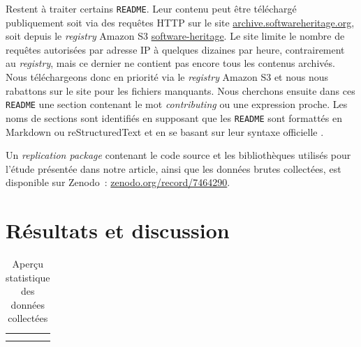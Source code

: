 \documentclass[dvipsnames,runningheads]{llncs}
\newcommand{\en}[1]{\foreignlanguage{english}{\emph{#1}}}
\begin{document}
    \label{sec:collectreadme}
    Restent à traiter certains \texttt{README}. Leur contenu peut être téléchargé publiquement soit via des
    requêtes HTTP sur le site \href{https://archive.softwareheritage.org/}{archive.softwareheritage.org}, soit
    depuis le \en{registry} Amazon S3
    \href{https://registry.opendata.aws/software-heritage}{software-heritage}. Le site limite le nombre de
    requêtes autorisées par adresse IP à quelques dizaines par heure, contrairement au \en{registry}, mais ce
    dernier ne contient pas encore tous les contenus archivés. Nous téléchargeons donc en priorité via le
    \en{registry} Amazon S3 et nous nous rabattons sur le site pour les fichiers manquants. Nous cherchons
    ensuite dans ces \texttt{README} une section contenant le mot \en{contributing} ou une expression proche.
    Les noms de sections sont identifiés en supposant que les \texttt{README} sont formattés en Markdown ou
    reStructuredText et en se basant sur leur syntaxe officielle \parencite{markdown-headings,rst-sections}.

    Un \en{replication package} contenant le code source et les bibliothèques utilisés pour l'étude présentée
    dans notre article, ainsi que les données brutes collectées, est disponible sur Zenodo :
    \href{https://zenodo.org/record/7464290}{zenodo.org/record/7464290}.

    \section{Résultats et discussion}

    \captionsetup[figure]{format=plain,singlelinecheck=true,justification=centering}
    \captionsetup[subfigure]{format=plain,singlelinecheck=true,justification=centering}
    \captionsetup[table]{format=plain,singlelinecheck=true,justification=centering,position=above}

    \begin{table}[ht]
        \centering
        \caption{Aperçu statistique des données collectées}
        \begin{tabular}{c|c}
             &
            \\
            \hline
            \\
             &
            
        \end{tabular}
        \label{tab:data_description}
    \end{table}
\end{document}
